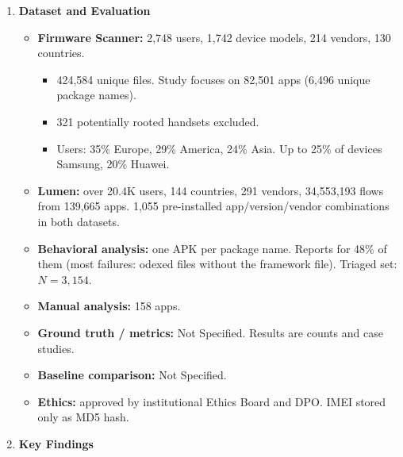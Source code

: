 \documentclass[11pt,a4paper]{article}
\newcommand{\entrypart}[1]{\textbf{\color{accent}#1}\par\vspace{2pt}}
\begin{document}
\begin{enumerate}
    \item \entrypart{Dataset and Evaluation}

    \begin{itemize}
        \item \textbf{Firmware Scanner:} 2,748 users, 1,742 device models, 214 vendors, 130 countries.
        \begin{itemize}
            \item 424,584 unique files. Study focuses on 82,501 apps (6,496 unique package names).
            \item 321 potentially rooted handsets excluded.
            \item Users: 35\% Europe, 29\% America, 24\% Asia. Up to 25\% of devices Samsung, 20\% Huawei.
        \end{itemize}
        \item \textbf{Lumen:} over 20.4K users, 144 countries, 291 vendors, 34,553,193 flows from 139,665 apps. 1,055 pre-installed app/version/vendor combinations in both datasets.
        \item \textbf{Behavioral analysis:} one APK per package name. Reports for 48\% of them (most failures: odexed files without the framework file). Triaged set: $N = 3{,}154$.
        \item \textbf{Manual analysis:} 158 apps.
        \item \textbf{Ground truth / metrics:} Not Specified. Results are counts and case studies.
        \item \textbf{Baseline comparison:} Not Specified.
        \item \textbf{Ethics:} approved by institutional Ethics Board and DPO. IMEI stored only as MD5 hash.
    \end{itemize}

    \item \entrypart{Key Findings}


\end{enumerate}
\end{document}
